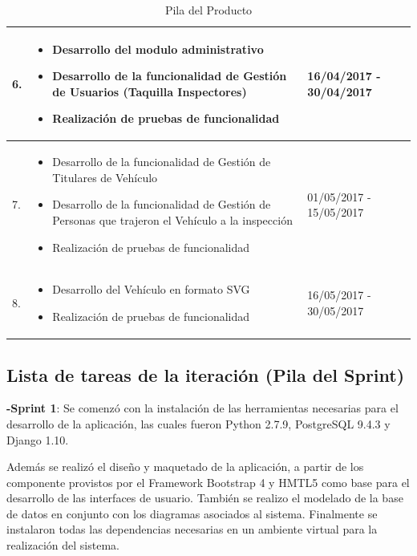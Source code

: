 \begin{table}[htb]
\begin{center}
\begin{tabular}{ | m{2cm} | m{9cm}| m{3cm}| }
 6. 
 & 
 \begin{itemize}
 	\item Desarrollo del modulo administrativo
 	\item Desarrollo de la funcionalidad de Gestión de Usuarios (Taquilla Inspectores)
 	\item Realización de pruebas de funcionalidad
 \end{itemize}
 & 
 16/04/2017 - 30/04/2017\\
 \hline

 7. 
 & 
 \begin{itemize}
 	\item Desarrollo de la funcionalidad de Gestión de Titulares de Vehículo
 	\item Desarrollo de la funcionalidad de Gestión de Personas que trajeron el Vehículo a la inspección
 	\item Realización de pruebas de funcionalidad
 \end{itemize}
 & 
 01/05/2017 - 15/05/2017\\
 \hline

 8.
 & 
 \begin{itemize}
 	\item Desarrollo del Vehículo en formato SVG
 	\item Realización de pruebas de funcionalidad
 \end{itemize}
 &
 16/05/2017 - 30/05/2017\\
 \hline

\end{tabular}
\caption{Pila del Producto}
\label{Tabla:15}
\end{center}
\end{table}	



\subsection{Lista de tareas de la iteración (Pila del Sprint)}
\setlength{\parskip}{5mm}

\textbf{-Sprint 1}: Se comenzó con la instalación de las herramientas necesarias para el desarrollo de la aplicación, las cuales fueron Python 2.7.9, PostgreSQL 9.4.3 y Django 1.10. 

Además se realizó el diseño y maquetado de la aplicación, a partir de los componente provistos por el Framework Bootstrap 4 y HMTL5 como base para el desarrollo de las interfaces de usuario. También se realizo el modelado de la base de datos en conjunto con los diagramas asociados al sistema. Finalmente se instalaron todas las dependencias necesarias en un ambiente virtual para la realización del sistema.


